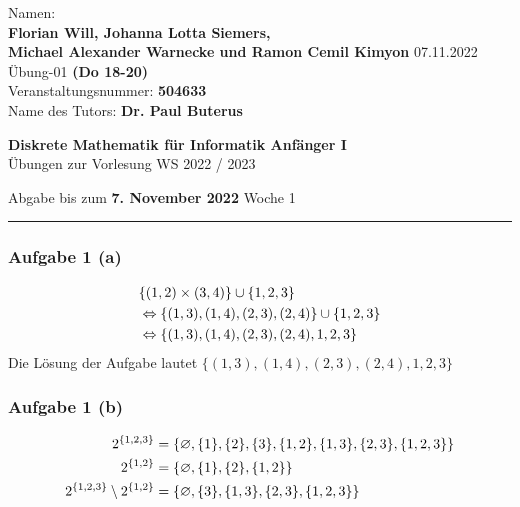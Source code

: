 \documentclass[a4paper, 10pt]{scrartcl}
\begin{document}
\begin{flushleft}
    Namen: \\\textbf{Florian Will, Johanna Lotta Siemers,\\ Michael Alexander Warnecke und Ramon Cemil Kimyon} \hspace*{\fill}
        07.11.2022 \\
    Übung-01 \textbf{(Do 18-20)}\\
    Veranstaltungsnummer: \textbf{504633} \\
    Name des Tutors: \textbf{Dr. Paul Buterus}


\end{flushleft}
\begin{center}
    \Large{\textbf{Diskrete Mathematik für Informatik Anfänger I}} \\
    \large{Übungen zur Vorlesung WS 2022 / 2023} \\
    \begin{flushleft}
        \normalsize{Abgabe bis zum \textbf{7. November 2022}} \hspace*{\fill}Woche 1 
    \end{flushleft}
    \noindent\rule{\textwidth}{1pt}
\end{center}

\subsubsection*{Aufgabe 1 \small(a)}
\begin{align}
    &\{(1, 2) \times (3, 4)\} \cup \{1, 2, 3\} \notag \\
    &\Leftrightarrow \{(1, 3), (1, 4), (2, 3), (2, 4)\} \cup \{1, 2, 3\} \notag \\
    &\Leftrightarrow \{(1, 3), (1, 4), (2, 3), (2, 4), 1, 2, 3\} \notag
\end{align}
Die Lösung der Aufgabe lautet $\{(1, 3), (1, 4), (2, 3), (2, 4), 1, 2, 3\}$ 

\subsubsection*{Aufgabe 1 \small(b)}
\begin{align}
    2^{\{1, 2, 3\}} &= \{\varnothing, \{1\}, \{2\}, \{3\}, \{1, 2\}, \{1, 3\}, \{2, 3\}, \{1, 2, 3\}\} \notag \\
    2^{\{1, 2\}} &= \{\varnothing, \{1\}, \{2\}, \{1, 2\}\} \notag \\
    2^{\{1, 2, 3\}} \setminus 2^{\{1, 2\}} &= \{\varnothing, \{3\}, \{1, 3\}, \{2, 3\}, \{1, 2, 3\}\} \notag 
\end{align}
\end{document}
